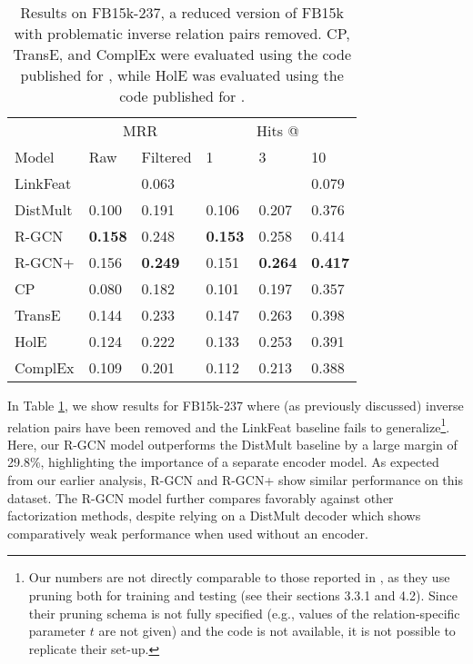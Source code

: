 \begin{table}[htp!]
\centering
\begin{tabular}{llllll}
\toprule
                                  & \multicolumn{2}{c}{MRR} & \multicolumn{3}{c}{Hits @} \\ \cmidrule{2-3} \cmidrule{4-6}
Model                             & Raw      & Filtered     & 1       & 3       & 10     \\ \midrule
LinkFeat     &  & 0.063         &    & & 0.079  \\ \midrule
DistMult     & 0.100         & 0.191         & 0.106   & 0.207   & 0.376  \\
R-GCN               & \textbf{0.158}       & 0.248 & \textbf{0.153}     & 0.258     & 0.414     \\
R-GCN+                     & 0.156 & \textbf{0.249} & 0.151     & \textbf{0.264}     & \textbf{0.417} \\     \midrule
CP     & 0.080 & 0.182 & 0.101 & 0.197 & 0.357 \\
TransE    	& 0.144	& 0.233 & 0.147 & 0.263 &	0.398  \\
HolE    	& 0.124	& 0.222 & 0.133 & 0.253 &	0.391  \\
ComplEx    & 0.109 & 0.201 & 0.112 & 0.213   & 0.388 \\
\bottomrule
\end{tabular}
\caption{Results on FB15k-237, a reduced version of FB15k with problematic inverse relation pairs removed. CP, TransE, and ComplEx were evaluated using the code published for \citet{complex-complex_embeddings_for_simple_link_prediction}, while HolE was evaluated using the code published for \citet{nickel2015holographic}.}
\label{table:fb15k-237}
\end{table}

In Table \ref{table:fb15k-237}, we show results for FB15k-237 where (as previously discussed) inverse relation pairs have been removed and the LinkFeat baseline fails to generalize\footnote{Our numbers are not directly comparable to those reported in \citet{toutanova2015observed}, as they use pruning both for training and testing (see their sections 3.3.1 and 4.2). Since their pruning schema is not fully specified (e.g., values of the relation-specific parameter $t$ are not given) and the code is not available, it is not possible to replicate their set-up.}. Here, our R-GCN model outperforms the DistMult baseline by a large margin of 29.8\%, highlighting the importance of a separate encoder model. As expected from our earlier analysis, R-GCN and R-GCN+ show similar performance on this dataset. The R-GCN model further compares favorably against other factorization methods, despite relying on a DistMult decoder which shows comparatively weak performance when used without an encoder.

